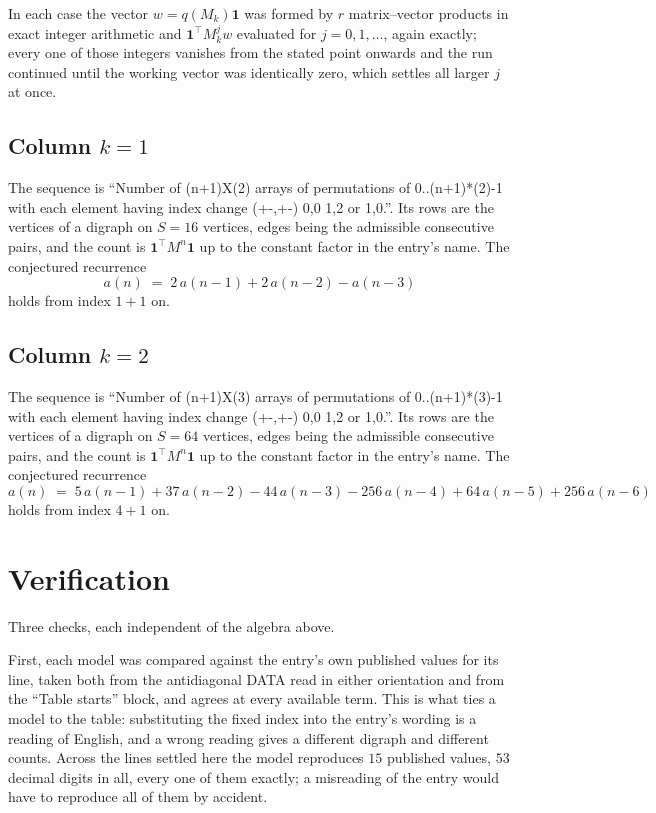 \documentclass[11pt,a4paper]{article}
\theoremstyle{plain}
\theoremstyle{definition}
\begin{document}
In each case the vector $w=q(M_k)\mathbf{1}$ was formed by $r$ matrix--vector products in
exact integer arithmetic and $\mathbf{1}^{\!\top}M_k^{j}w$ evaluated for $j=0,1,\dots$,
again exactly; every one of those integers vanishes from the stated point onwards and the run
continued until the working vector was identically zero, which settles all larger $j$ at once.

\subsection*{Column $k$$=1$}
The sequence is ``Number of (n+1)X(2) arrays of permutations of 0..(n+1)*(2)-1 with each element having index change (+-,+-) 0,0 1,2 or 1,0.''. Its rows are the vertices of a digraph on
$S=16$ vertices, edges being the admissible consecutive pairs, and the count is
$\mathbf{1}^{\!\top}M^{n}\mathbf{1}$ up to the constant factor in the entry's name.
The conjectured recurrence
\[
a(n)\;=\;2\,a(n-1) + 2\,a(n-2) - a(n-3)
\]
holds from index $1+1$ on.

\subsection*{Column $k$$=2$}
The sequence is ``Number of (n+1)X(3) arrays of permutations of 0..(n+1)*(3)-1 with each element having index change (+-,+-) 0,0 1,2 or 1,0.''. Its rows are the vertices of a digraph on
$S=64$ vertices, edges being the admissible consecutive pairs, and the count is
$\mathbf{1}^{\!\top}M^{n}\mathbf{1}$ up to the constant factor in the entry's name.
The conjectured recurrence
\[
a(n)\;=\;5\,a(n-1) + 37\,a(n-2) - 44\,a(n-3) - 256\,a(n-4) + 64\,a(n-5) + 256\,a(n-6)
\]
holds from index $4+1$ on.

\section{Verification}

Three checks, each independent of the algebra above.

First, each model was compared against the entry's own published values for its line, taken
both from the antidiagonal DATA read in either orientation and from the ``Table starts''
block, and agrees at every available term. This is what ties a model to the table:
substituting the fixed index into the entry's wording is a reading of English, and a wrong
reading gives a different digraph and different counts. Across the lines settled here the
model reproduces $15$ published values, $53$ decimal digits in all, every one of
them exactly; a misreading of the entry would have to reproduce all of them by accident.
\end{document}
